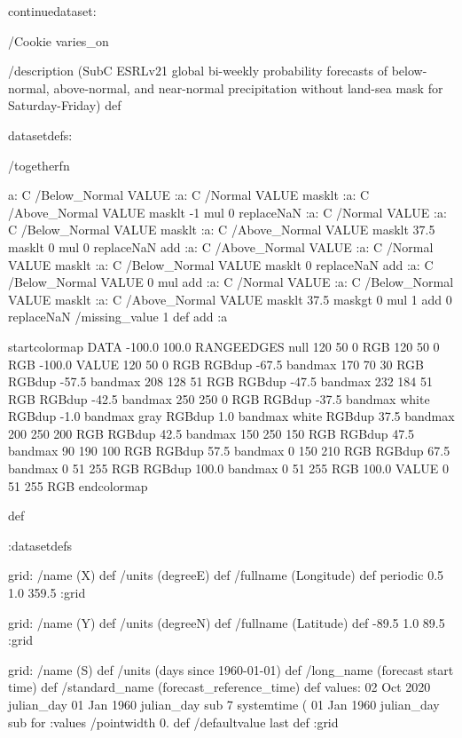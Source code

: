 \begin{ingrid}

continuedataset:


/Cookie varies_on

/description (SubC ESRLv21 global bi-weekly probability forecasts of below-normal, above-normal, and near-normal precipitation without land-sea mask for Saturday-Friday) def

datasetdefs:

/togetherfn {
 a:
    C /Below_Normal VALUE
    :a:
     C /Normal VALUE
     masklt
    :a:
     C /Above_Normal VALUE
     masklt
    -1 mul
    0 replaceNaN
    :a:
     C /Normal VALUE
     :a:
      C /Below_Normal VALUE
      masklt
     :a:
      C /Above_Normal VALUE
      masklt
     37.5 masklt
     0 mul
     0 replaceNaN           
     add
    :a:
     C /Above_Normal VALUE
     :a:
      C /Normal VALUE
      masklt
     :a:
      C /Below_Normal VALUE
      masklt
     0 replaceNaN
     add
 :a:
     C /Below_Normal VALUE
     0 mul
     add
    :a:
     C /Normal VALUE
     :a:
      C /Below_Normal VALUE
      masklt
     :a:
      C /Above_Normal VALUE        
      masklt
     37.5 maskgt
     0 mul
     1 add
     0 replaceNaN
     /missing_value 1 def
     add
    :a

startcolormap
DATA -100.0 100.0 RANGEEDGES
null 120 50 0 RGB
120 50 0 RGB -100.0 VALUE
120 50 0 RGB RGBdup -67.5 bandmax
170 70 30 RGB RGBdup -57.5 bandmax
208 128 51 RGB RGBdup -47.5 bandmax
232 184 51 RGB RGBdup -42.5 bandmax
250 250 0 RGB RGBdup -37.5 bandmax
white RGBdup -1.0 bandmax
gray RGBdup 1.0 bandmax
white RGBdup 37.5 bandmax
200 250 200 RGB RGBdup 42.5 bandmax
150 250 150 RGB RGBdup 47.5 bandmax
90 190 100 RGB RGBdup 57.5 bandmax
0 150 210 RGB RGBdup 67.5 bandmax
0 51 255 RGB RGBdup 100.0 bandmax
0 51 255 RGB 100.0 VALUE
0 51 255 RGB
endcolormap
} def 

:datasetdefs


grid:
/name (X) def
/units (degreeE) def
/fullname (Longitude) def
periodic
0.5 1.0 359.5
:grid

grid:
/name (Y) def
/units (degreeN) def
/fullname (Latitude) def
-89.5 1.0 89.5
:grid


grid:
/name (S) def
/units (days since 1960-01-01) def
/long_name (forecast start time) def
/standard_name (forecast_reference_time) def
values:
02 Oct 2020 julian_day 01 Jan 1960 julian_day sub
7
systemtime
(%
01 Jan 1960 julian_day sub 
{} for
:values
/pointwidth 0. def
/defaultvalue { last } def
:grid


\end{ingrid}
